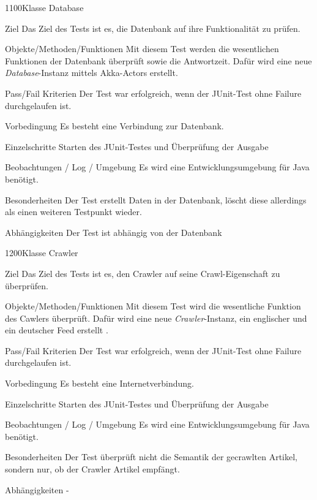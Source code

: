 \begin{testcase}{1100}{Klasse Database}
\item[Ziel] Das Ziel des Tests ist es, die Datenbank auf ihre Funktionalität zu
prüfen.
\item[Objekte/Methoden/Funktionen] Mit diesem Test werden die wesentlichen
Funktionen der Datenbank überprüft sowie die Antwortzeit.
Dafür wird eine neue \textit{Database}-Instanz mittels Akka-Actors erstellt.
\item[Pass/Fail Kriterien] Der Test war erfolgreich, wenn der JUnit-Test ohne
Failure durchgelaufen ist.
\item[Vorbedingung] Es besteht eine Verbindung zur Datenbank.
\item[Einzelschritte] Starten des JUnit-Testes und Überprüfung der Ausgabe 
\item[Beobachtungen / Log / Umgebung] Es wird eine Entwicklungsumgebung für Java
benötigt.
\item[Besonderheiten] Der Test erstellt Daten in der Datenbank, löscht diese
allerdings als einen weiteren Testpunkt wieder.
\item[Abhängigkeiten] Der Test ist abhängig von der Datenbank
\end{testcase}

\begin{testcase}{1200}{Klasse Crawler}
\item[Ziel] Das Ziel des Tests ist es, den Crawler auf seine Crawl-Eigenschaft
zu überprüfen.
\item[Objekte/Methoden/Funktionen] Mit diesem Test wird die wesentliche
Funktion des Cawlers überprüft.
Dafür wird eine neue \textit{Crawler}-Instanz, ein englischer und ein deutscher
Feed erstellt .
\item[Pass/Fail Kriterien] Der Test war erfolgreich, wenn der JUnit-Test ohne
Failure durchgelaufen ist.
\item[Vorbedingung] Es besteht eine Internetverbindung.
\item[Einzelschritte] Starten des JUnit-Testes und Überprüfung der Ausgabe 
\item[Beobachtungen / Log / Umgebung] Es wird eine Entwicklungsumgebung für Java
benötigt.
\item[Besonderheiten] Der Test überprüft nicht die Semantik der gecrawlten
Artikel, sondern nur, ob der Crawler Artikel empfängt.
\item[Abhängigkeiten] -
\end{testcase}

